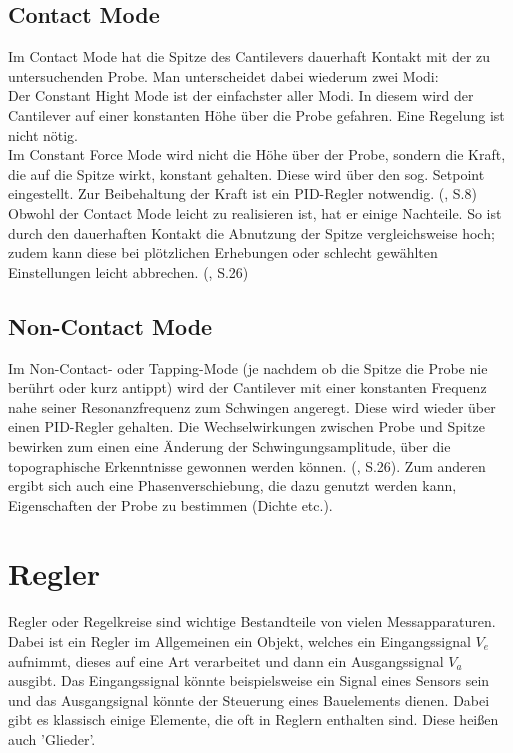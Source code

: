 \subsection{Contact Mode}
Im Contact Mode hat die Spitze des Cantilevers dauerhaft Kontakt mit der zu untersuchenden Probe. Man unterscheidet dabei wiederum zwei Modi: \\
Der Constant Hight Mode ist der einfachster aller Modi. In diesem wird der Cantilever auf einer konstanten Höhe über die Probe gefahren. 
Eine Regelung ist nicht nötig. \footnotemark \\
Im Constant Force Mode wird nicht die Höhe über der Probe, sondern die Kraft, die auf die Spitze wirkt, konstant gehalten. Diese wird 
über den sog. Setpoint eingestellt. Zur Beibehaltung der Kraft ist ein PID-Regler notwendig. (\cite{Rieger2013}, S.8)\\
Obwohl der Contact Mode leicht zu realisieren ist, hat er einige Nachteile. So ist durch den dauerhaften Kontakt die Abnutzung der Spitze 
vergleichsweise hoch; zudem kann diese bei plötzlichen Erhebungen oder schlecht gewählten Einstellungen leicht abbrechen. (\cite{Vesely2017}, S.26)

\subsection{Non-Contact Mode}
Im Non-Contact- oder Tapping-Mode (je nachdem ob die Spitze die Probe nie berührt oder kurz antippt) wird der Cantilever mit einer 
konstanten Frequenz nahe seiner Resonanzfrequenz zum Schwingen angeregt. Diese wird wieder über einen PID-Regler gehalten. 
Die Wechselwirkungen zwischen Probe und Spitze bewirken zum einen eine Änderung der Schwingungsamplitude, über die topographische 
Erkenntnisse gewonnen werden können. (\cite{Vesely2017}, S.26). Zum anderen ergibt sich auch eine Phasenverschiebung, die dazu genutzt 
werden kann, Eigenschaften der Probe zu bestimmen (Dichte etc.). \footnotemark
{}
 
\section{Regler}

Regler oder Regelkreise sind wichtige Bestandteile von vielen Messapparaturen. Dabei ist ein Regler im Allgemeinen ein Objekt, welches 
ein Eingangssignal $V_e$ aufnimmt, dieses auf eine Art verarbeitet und dann ein Ausgangssignal $V_a$ ausgibt. Das Eingangssignal könnte 
beispielsweise ein Signal eines Sensors sein und das Ausgangsignal könnte der Steuerung eines Bauelements dienen. Dabei gibt es klassisch einige Elemente, die 
oft in Reglern enthalten sind. Diese heißen auch 'Glieder'.

